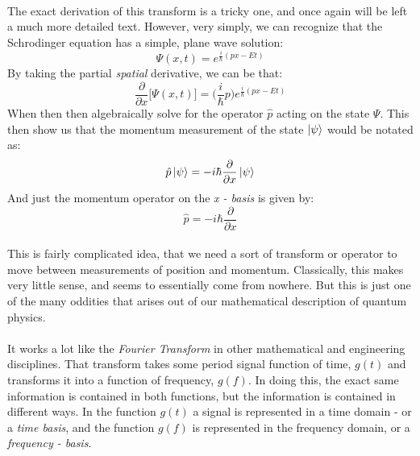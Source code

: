 \documentclass[12pt,letterpaper]{book}
\begin{document}
\paragraph*{}The exact derivation of this transform is a tricky one, and once again will be left a much more detailed text. However, very simply, we can recognize that the Schrodinger equation has a simple, plane wave solution:
\begin{equation}
\label{plane wave sol}
\Psi(x,t) = e^{\frac{i}{\hbar}(px - Et)}
\end{equation} 
By taking the partial \textit{spatial} derivative, we can be that:
\begin{equation}
\frac{\partial}{\partial x}\Big[ \Psi(x,t) \Big] = \big( \frac{i}{\hbar}p\big) e^{\frac{i}{\hbar}(px - Et)}
\end{equation}
When then then algebraically solve for the operator $\hat{p}$ acting on the state $\Psi$. This then show us that the momentum measurement of the state $\ket{\psi}$ would be notated as:
\begin{equation}
\label{momentum on psi}
\hat{p}\ket{\psi} = -i\hbar\frac{\partial}{\partial x}\ket{\psi}
\end{equation}
And just the momentum operator on the \textit{x - basis} is given by:
\begin{equation}
\label{momentum}
\hat{p} = -i\hbar\frac{\partial}{\partial x}
\end{equation}
\paragraph*{}This is fairly complicated idea, that we need a sort of transform or operator to move between measurements of position and momentum. Classically, this makes very little sense, and seems to essentially come from nowhere. But this is just one of the many oddities that arises out of our mathematical description of quantum physics. 
\paragraph*{}It works a lot like the \textit{Fourier Transform} in other mathematical and engineering disciplines. That transform takes some period signal function of time, $g(t)$ and transforms it into a function of frequency, $g(f)$. In doing this, the exact same information is contained in both functions, but the information is contained in different ways. In the function $g(t)$ a signal is represented in a time domain - or a \textit{time basis}, and the function $g(f)$ is represented in the frequency domain, or a \textit{frequency - basis}.
\end{document}
